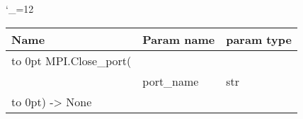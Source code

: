 \begingroup \catcode`\_=12 \tt
\begin{tabular}{lll}
\toprule
\textrm{Name}&\textrm{Param name}&\textrm{param type}\\
\midrule
\hbox to 0pt {MPI.Close_port(\hss}\\
& port_name & str\\
\hbox to 0pt{) -> None\hss}\\
\bottomrule
\end{tabular}
\endgroup
